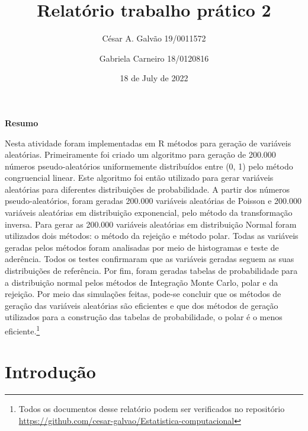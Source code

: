 \documentclass[
]{article}
\title{Relatório trabalho prático 2}
\author{César A. Galvão 19/0011572 \and Gabriela Carneiro 18/0120816}
\date{18 de July de 2022}
\begin{document}
\maketitle

\newpage{}

{
\setcounter{tocdepth}{2}
\tableofcontents
}
\let\oldsection\section
\renewcommand\section{\clearpage\oldsection}

\begin{center} 

\textbf{Resumo} 

\end{center}

Nesta atividade foram implementadas em R métodos para geração de
variáveis aleatórias. Primeiramente foi criado um algoritmo para geração
de 200.000 números pseudo-aleatórios uniformemente distribuídos entre
(0, 1) pelo método congruencial linear. Este algoritmo foi então
utilizado para gerar variáveis aleatórias para diferentes distribuições
de probabilidade. A partir dos números pseudo-aleatórios, foram geradas
200.000 variáveis aleatórias de Poisson e 200.000 variáveis aleatórias
em distribuição exponencial, pelo método da transformação inversa. Para
gerar as 200.000 variáveis aleatórias em distribuição Normal foram
utilizados dois métodos: o método da rejeição e método polar. Todas as
variáveis geradas pelos métodos foram analisadas por meio de histogramas
e teste de aderência. Todos os testes confirmaram que as variáveis
geradas seguem as suas distribuições de referência. Por fim, foram
geradas tabelas de probabilidade para a distribuição normal pelos
métodos de Integração Monte Carlo, polar e da rejeição. Por meio das
simulações feitas, pode-se concluir que os métodos de geração das
variáveis aleatórias são eficientes e que dos métodos de geração
utilizados para a construção das tabelas de probabilidade, o polar é o
menos eficiente.\footnote{Todos os documentos desse relatório podem ser
  verificados no repositório
  \url{https://github.com/cesar-galvao/Estatistica-computacional}}

\hypertarget{introduuxe7uxe3o}{%
\section{Introdução}\label{introduuxe7uxe3o}}
\end{document}
